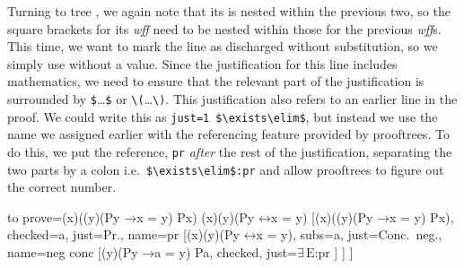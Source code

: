 \documentclass[10pt,british,a4paper,doc2]{ltxdoc}
\newcommand*\pkg[1]{\textsf{#1}}
\newcommand*{\lif}{\ensuremath{\mathbin{\rightarrow}}}
\newcommand*{\liff}{\ensuremath{\mathbin{\leftrightarrow}}}
\newcommand*{\elim}{\,\text{E}}
\newcommand*\wff{\emph{wff}}
\begin{document}
Turning to tree \nyth*{}, we again note that its \bocsnyth{} is nested within the previous two, so the square brackets for its \wff{} need to be nested within those for the previous \wff{}s.
This time, we want to mark the line as discharged without substitution, so we simply use  without a value.
Since the justification for this line includes mathematics, we need to ensure that the relevant part of the justification is surrounded by \verb|$|\dots \verb|$| or \verb|\(|\dots\verb|\)|.
This justification also refers to an earlier line in the proof.
We could write this as \verb|just=1 $\exists\elim$|, but instead we use the name we assigned earlier with the referencing feature provided by \pkg{prooftrees}.
To do this, we put the reference, \verb|pr| \emph{after} the rest of the justification, separating the two parts by a colon i.e.~\verb|$\exists\elim$:pr| and allow \pkg{prooftrees} to figure out the correct number.
\begin{latexcode}
\begin{tableau}
  {
    to prove={(\exists x)((\forall y)(Py \lif x = y) \land Px) \sststile{}{} (\exists x)(\forall y)(Py \liff x = y)}
  }
  [{(\exists x)((\forall y)(Py \lif x = y) \land Px)}, checked=a, just=Pr., name=pr
    [{\lnot (\exists x)(\forall y)(Py \liff x = y)}, subs=a, just=Conc.~neg., name=neg conc
      [{(\forall y)(Py \lif a = y) \land Pa}, checked, just=$\exists\elim$:pr
      ]
    ]
  ]
\end{tableau}
\end{latexcode}
\end{document}
